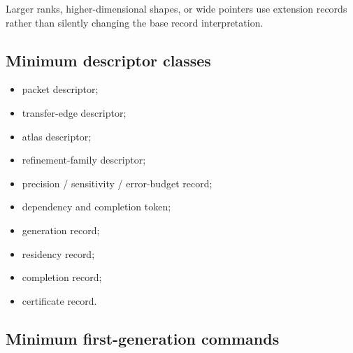 \documentclass[10pt,letterpaper]{article}
\begin{document}
Larger ranks, higher-dimensional shapes, or wide pointers use extension records rather than silently changing the base record interpretation.

\subsection{Minimum descriptor classes}

\begin{itemize}
\item packet descriptor;
\item transfer-edge descriptor;
\item atlas descriptor;
\item refinement-family descriptor;
\item precision / sensitivity / error-budget record;
\item dependency and completion token;
\item generation record;
\item residency record;
\item completion record;
\item certificate record.
\end{itemize}

\subsection{Minimum first-generation commands}
\end{document}
